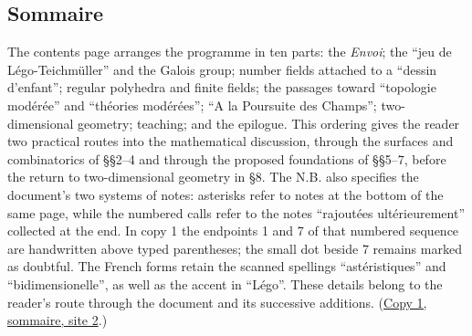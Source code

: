 \subsection*{Sommaire}
The contents page arranges the programme in ten parts: the \emph{Envoi}; the
``jeu de Légo-Teichmüller'' and the Galois group; number fields attached to a
``dessin d'enfant''; regular polyhedra and finite fields; the passages toward
``topologie modérée'' and ``théories modérées''; ``A la Poursuite des Champs'';
two-dimensional geometry; teaching; and the epilogue. This ordering gives the
reader two practical routes into the mathematical discussion, through the
surfaces and combinatorics of \S\S2--4 and through the proposed foundations of
\S\S5--7, before the return to two-dimensional geometry in \S8. The N.B.
also specifies the document's two systems of notes: asterisks refer to notes
at the bottom of the same page, while the numbered calls refer to the notes
``rajoutées ultérieurement'' collected at the end. In copy 1 the endpoints
1 and 7 of that numbered sequence are handwritten above typed parentheses;
the small dot beside 7 remains marked as doubtful. The French forms retain
the scanned spellings ``astéristiques'' and ``bidimensionelle'', as well as
the accent in ``Légo''. These details belong to the reader's route through
the document and its successive additions.
(\href{https://grothendieck.umontpellier.fr/web/viewer.html?file=../119.pdf\#page=3}{Copy 1, sommaire, site 2}.)

